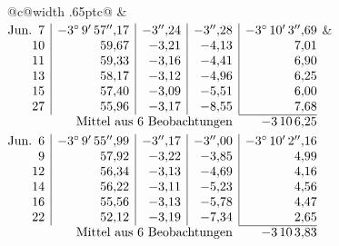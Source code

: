 \noindent\begin{tabular}{@{}c@{\hspace{.4em}\vrule width .65pt\hspace{.4em}}c@{}}
 &
 \\[.18ex]
\(\begin{array}[t]{@{}r|r|r|r|r@{}}
\text{Jun.}\enspace 7 & -3^\circ\,9'\,57''{,}17 & -3''{,}24 & -3''{,}28 & -3^\circ\,10'\,3''{,}69\\
10 & 59{,}67 & -3{,}21 & -4{,}13 & 7{,}01\\
11 & 59{,}33 & -3{,}16 & -4{,}41 & 6{,}90\\
13 & 58{,}17 & -3{,}12 & -4{,}96 & 6{,}25\\
15 & 57{,}40 & -3{,}09 & -5{,}51 & 6{,}00\\
27 & 55{,}96 & -3{,}17 & -8{,}55 & 7{,}68\\
\cline{5-5}
\multicolumn{4}{r}{\text{Mittel aus 6 Beobachtungen}} & -3\,10\,6{,}25
\end{array}\)
&
\(\begin{array}[t]{@{}r|r|r|r|r@{}}
\text{Jun.}\enspace 6 & -3^\circ\,9'\,55''{,}99 & -3''{,}17 & -3''{,}00 & -3^\circ\,10'\,2''{,}16\\
9 & 57{,}92 & -3{,}22 & -3{,}85 & 4{,}99\\
12 & 56{,}34 & -3{,}13 & -4{,}69 & 4{,}16\\
14 & 56{,}22 & -3{,}11 & -5{,}23 & 4{,}56\\
16 & 55{,}56 & -3{,}13 & -5{,}78 & 4{,}47\\
22 & 52{,}12 & -3{,}19 & -7{,}34 & 2{,}65\\
\cline{5-5}
\multicolumn{4}{r}{\text{Mittel aus 6 Beobachtungen}} & -3\,10\,3{,}83
\end{array}\)
\end{tabular}\par\medskip
{}
